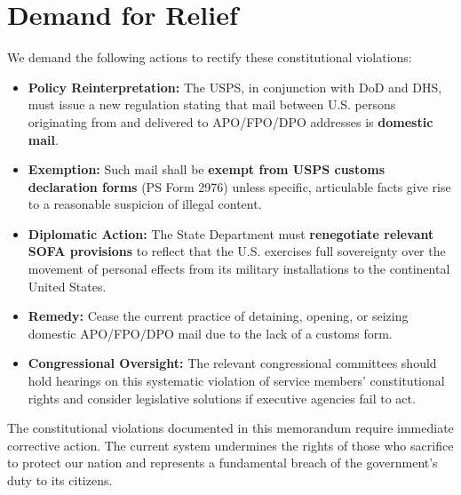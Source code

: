 ﻿\section{Demand for Relief}

We demand the following actions to rectify these constitutional violations:
\begin{itemize}
\item \textbf{Policy Reinterpretation:} The USPS, in conjunction with DoD and DHS, must issue a new regulation stating that mail between U.S. persons originating from and delivered to APO/FPO/DPO addresses is \textbf{domestic mail}.
\item \textbf{Exemption:} Such mail shall be \textbf{exempt from USPS customs declaration forms} (PS Form 2976) unless specific, articulable facts give rise to a reasonable suspicion of illegal content.
\item \textbf{Diplomatic Action:} The State Department must \textbf{renegotiate relevant SOFA provisions} to reflect that the U.S. exercises full sovereignty over the movement of personal effects from its military installations to the continental United States.
\item \textbf{Remedy:} Cease the current practice of detaining, opening, or seizing domestic APO/FPO/DPO mail due to the lack of a customs form.
\item \textbf{Congressional Oversight:} The relevant congressional committees should hold hearings on this systematic violation of service members' constitutional rights and consider legislative solutions if executive agencies fail to act.
\end{itemize}

The constitutional violations documented in this memorandum require immediate corrective action. The current system undermines the rights of those who sacrifice to protect our nation and represents a fundamental breach of the government's duty to its citizens.
